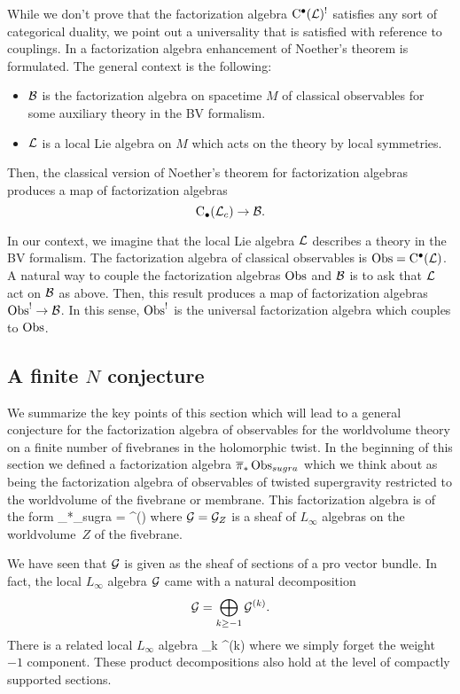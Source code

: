 While we don't prove that the factorization algebra ${\rm C}^\bullet(\mathcal L)^!$ satisfies any sort of categorical duality, we point out a universality that is satisfied with reference to couplings.
In \cite[Part 3]{CG2} a factorization algebra enhancement of Noether's theorem is formulated. 
The general context is the following: 
\begin{itemize}
\item $\mathcal B$ is the factorization algebra on spacetime $M$ of classical observables for some auxiliary theory in the BV formalism.
\item $\mathcal L$ is a local Lie algebra on $M$ which acts on the theory by local symmetries. 
\end{itemize}
Then, the classical version of Noether's theorem for factorization algebras produces a map of factorization algebras 
\[
{\rm C}_\bullet(\mathcal L_c) \to \mathcal B .
\]

In our context, we imagine that the local Lie algebra $\mathcal L$ describes a theory in the BV formalism.
The factorization algebra of classical observables is $\operatorname{Obs} = {\rm C}^\bullet(\mathcal L)$. 
A natural way to couple the factorization algebras $\operatorname{Obs}$ and $\mathcal B$ is to ask that $\mathcal L$ act on $\mathcal B$ as above.
Then, this result produces a map of factorization algebras $\operatorname{Obs}^! \to \mathcal B$.
In this sense, $\operatorname{Obs}^!$ is the universal factorization algebra which couples to $\operatorname{Obs}$.

\subsection{A finite $N$ conjecture}
\label{sec:factsummary}

We summarize the key points of this section which will lead to a general conjecture for the factorization algebra of observables for the worldvolume theory on a finite number of fivebranes in the holomorphic twist.
In the beginning of this section we defined a factorization algebra $\overline{\pi}_*\operatorname{Obs}_{sugra}$ which we think about as being the factorization algebra of observables of twisted supergravity restricted to the worldvolume of the fivebrane or membrane.
This factorization algebra is of the form 
\beqn
\label{eqn:factgrad}
\Bar{\pi}_*\Obs_{sugra} = \clie^\bu(\cG)
\eeqn
where $\mathcal G = \mathcal G_Z$ is a sheaf of $L_\infty$ algebras on the worldvolume~$Z$ of the fivebrane.

We have seen that $\mathcal G$ is given as the sheaf of sections of a pro vector bundle. 
In fact, the local $L_\infty$ algebra $\mathcal G$ came with a natural decomposition 
\[
\mathcal G = \bigoplus_{k \geq -1} \mathcal G^{(k)} .
\]
There is a related local $L_\infty$ algebra 
\beqn
\til \cG {} \bigoplus_{k } \cG^{(k)}
\eeqn
where we simply forget the weight $-1$ component. 
These product decompositions also hold at the level of compactly supported sections. 

